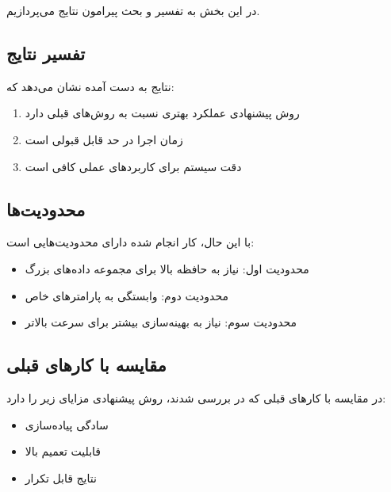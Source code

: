 در این بخش به تفسیر و بحث پیرامون نتایج می‌پردازیم.

\subsection{تفسیر نتایج}
نتایج به دست آمده نشان می‌دهد که:

\begin{enumerate}
    \item روش پیشنهادی عملکرد بهتری نسبت به روش‌های قبلی دارد
    \item زمان اجرا در حد قابل قبولی است
    \item دقت سیستم برای کاربردهای عملی کافی است
\end{enumerate}

\subsection{محدودیت‌ها}
با این حال، کار انجام شده دارای محدودیت‌هایی است:

\begin{itemize}
    \item محدودیت اول: نیاز به حافظه بالا برای مجموعه داده‌های بزرگ
    \item محدودیت دوم: وابستگی به پارامترهای خاص
    \item محدودیت سوم: نیاز به بهینه‌سازی بیشتر برای سرعت بالاتر
\end{itemize}

\subsection{مقایسه با کارهای قبلی}
در مقایسه با کارهای قبلی که در  بررسی شدند، روش پیشنهادی مزایای زیر را دارد:
\begin{itemize}
    \item سادگی پیاده‌سازی
    \item قابلیت تعمیم بالا
    \item نتایج قابل تکرار
\end{itemize}

